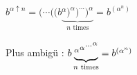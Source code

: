 \documentclass[10pt,a4paper]{article}
\newcommand\recexpo{\mathbin{\uparrow}}
\begin{document}
$
	b^{\alpha \recexpo n}
	=
	\bigl(
		\cdots
		\bigl(
			\bigl(
				b \underbrace{^\alpha
			\bigr)
			^\alpha
		\bigr)
		^{\cdots}
	\bigr)
	^\alpha}_\text{$n$ times}
	= b^{(\alpha^n)}
$

Plus ambigü :
$
	b \underbrace{
	  {{{^{\alpha\vphantom{h}}}^{\alpha\vphantom{h}}}^{\cdots\vphantom{h}}}^{\alpha\vphantom{h}}
	}_{\text{$n$ times}}
	= b^{(\alpha^n)}
$
\end{document}
